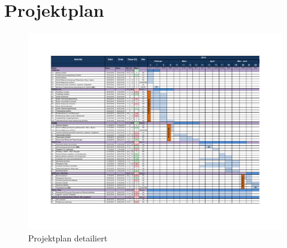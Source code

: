 \pdfpagewidth 420mm
\pdfpageheight 297mm
\section{Projektplan}
\begin{figure}[H]
	\centering
	\includegraphics[scale=1.1]{Anhang/NEBULA-Projektplan-v1.pdf}
	\caption{Projektplan detailiert}
\end{figure}
